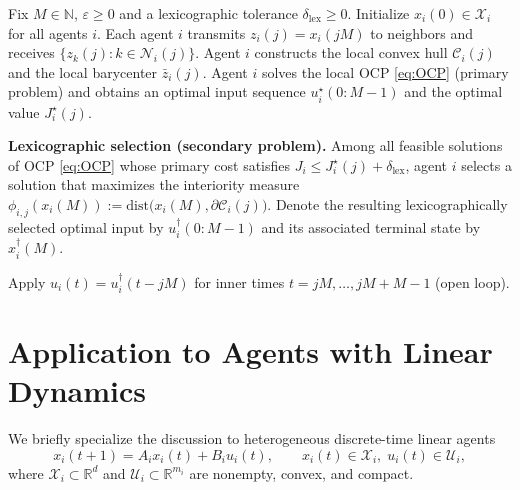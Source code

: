 \documentclass[12pt,draftcls,onecolumn]{IEEEtran}
\def\field#1{\mathbb #1}%
\def\R{\field{R}}%
\def\N{\field{N}}%
\newcommand{\X}{\ensuremath{\mathcal X}}
\newcommand{\U}{\ensuremath{\mathcal U}}
\def\dist{\mathrm{dist}}
\begin{document}
\begin{algorithm}[ht]
\caption{Distributed multi-step MPC routine with lexicographic selection}
\label{alg:dmproutine_lex}
\begin{algorithmic}[1]
\State Fix $M\in\N$, $\varepsilon\ge 0$ and a lexicographic tolerance $\delta_{\mathrm{lex}} \geq 0$.
\State Initialize $x_i(0)\in \X_i$ for all agents $i$.
  \State Each agent $i$ transmits $z_i(j)=x_i(jM)$ to neighbors and receives $\{z_k(j):k\in\mathcal{N}_i(j)\}$.
  \State Agent $i$ constructs the local convex hull $\mathcal{C}_i(j)$ and the local barycenter $\bar z_i(j)$.
  \State Agent $i$ solves the local OCP \eqref{eq:OCP} (primary problem) and obtains an optimal input sequence
        $u_i^{\star}(0{:}M{-}1)$ and the optimal value $J_i^{\star}(j)$.

  \State \textbf{Lexicographic selection (secondary problem).}
  \Statex \hspace{1.5em} Among all feasible solutions of OCP \eqref{eq:OCP} whose primary cost satisfies
  \Statex \hspace{1.5em} $J_i \le J_i^{\star}(j) + \delta_{\mathrm{lex}}$,
  \Statex \hspace{1.5em} agent $i$ selects a solution that maximizes the interiority measure
  \Statex \hspace{1.5em} $\phi_{i,j}(x_i(M)):=\dist\!\big(x_i(M),\partial \mathcal{C}_i(j)\big)$.
  \Statex \hspace{1.5em} Denote the resulting lexicographically selected optimal input by
  \Statex \hspace{1.5em} $u_i^{\dagger}(0{:}M{-}1)$ and its associated terminal state by $x_i^{\dagger}(M)$.

  \State Apply $u_i(t)=u_i^{\dagger}(t-jM)$ for inner times $t=jM,\dots,jM+M-1$ (open loop).
\EndFor
\end{algorithmic}
\end{algorithm}

\section{Application to Agents with Linear Dynamics}\label{sec:linear-dynamics}

We briefly specialize the discussion to heterogeneous discrete-time linear agents
\begin{equation}\label{eq:lti_agents}
x_i(t{+}1)=A_i x_i(t)+B_i u_i(t),\qquad x_i(t)\in \X_i,\;u_i(t)\in \U_i,
\end{equation}
where $\X_i\subset\R^d$ and $\U_i\subset\R^{m_i}$ are nonempty, convex, and compact.
\end{document}
